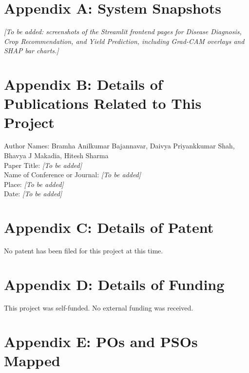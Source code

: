 \documentclass[12pt,a4paper]{report}
\begin{document}
\section{Appendix A: System Snapshots}
\textit{[To be added: screenshots of the Streamlit frontend pages for Disease Diagnosis, Crop Recommendation, and Yield Prediction, including Grad-CAM overlays and SHAP bar charts.]}

\clearpage
\section{Appendix B: Details of Publications Related to This Project}
\large{Author Names:} Bramha Anilkumar Bajannavar, Daivya Priyankkumar Shah, Bhavya J Makadia, Hitesh Sharma\\
\large{Paper Title:} \textit{[To be added]}\\
\large{Name of Conference or Journal:} \textit{[To be added]}\\
\large{Place:} \textit{[To be added]}\\
\large{Date:} \textit{[To be added]}

\clearpage
\section{Appendix C: Details of Patent}
No patent has been filed for this project at this time.

\clearpage
\section{Appendix D: Details of Funding}
This project was self-funded. No external funding was received.

\clearpage
\section{Appendix E: POs and PSOs Mapped}
\end{document}

